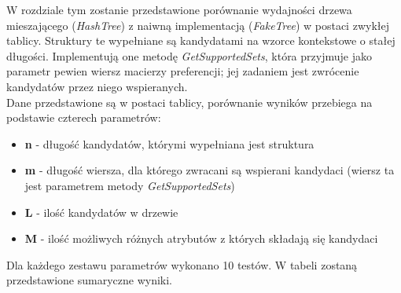 \documentclass[a4paper,12pt]{article}
\begin{document}
W rozdziale tym zostanie przedstawione porównanie wydajności drzewa mieszającego (\textit{HashTree}) z naiwną implementacją (\textit{FakeTree}) w postaci zwykłej tablicy. Struktury te wypełniane są kandydatami na wzorce kontekstowe o stałej długości. Implementują one metodę \textit{GetSupportedSets}, która przyjmuje jako parametr pewien wiersz macierzy preferencji; jej zadaniem jest zwrócenie kandydatów przez niego wspieranych. \\
Dane przedstawione są w postaci tablicy, porównanie wyników przebiega na podstawie czterech parametrów:
\begin{itemize}
\item {\bf n} - długość kandydatów, którymi wypełniana jest struktura
\item {\bf m} - długość wiersza, dla którego zwracani są wspierani kandydaci (wiersz ta jest parametrem metody \textit{GetSupportedSets})
\item {\bf L} - ilość kandydatów w drzewie
\item {\bf M} - ilość możliwych różnych atrybutów z których składają się kandydaci
\end{itemize}

Dla każdego zestawu parametrów wykonano 10 testów. W tabeli zostaną przedstawione sumaryczne wyniki. \\
\end{document}

